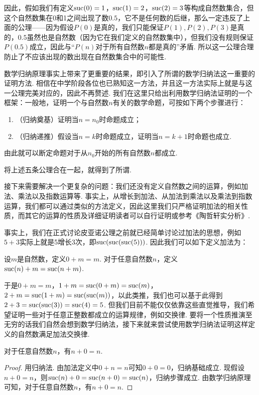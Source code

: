 因此，假如我们有定义$\operatorname{suc}(0)=1$，$\operatorname{suc}(1)=2$，$\operatorname{suc}(2)=3$等构成自然数集合，但这个自然数集在0和1之间出现了数$0.5$，它不是任何数的后继，那么一定违反了上面的公理——因为假设$P(0)$是真的，我们只能保证$P(1),P(2),P(3)$是真的，$0.5$虽然也是自然数（因为它在我们定义的自然数集中），但我们没有规则保证$P(0.5)$成立，因此与``$P(n)$对于所有自然数$n$都是真的''矛盾. 所以这一公理合理防止了不应该出现的数出现在自然数集合中的可能性.

数学归纳原理事实上带来了更重要的结果，即引入了所谓的数学归纳法这一重要的证明方法. 相信在中学阶段各位也已熟知这一方法，并且这一方法实际上就是与这一公理完美对应的，因此不再赘述. 我们在这里只给出利用数学归纳法证明的一个框架：一般地，证明一个与自然数$n$有关的数学命题，可按如下两个步骤进行：
\begin{enumerate}
    \item（归纳奠基）证明当$n=n_0$时命题成立；

    \item（归纳递推）假设当$n=k$时命题成立，证明当$n=k+1$时命题也成立.
\end{enumerate}
由此就可以断定命题对于从$n_0$开始的所有自然数$n$都成立.

将上述五条公理合在一起，就得到了所谓.

接下来需要解决一个更复杂的问题：我们还没有定义自然数之间的运算，例如加法、乘法以及指数运算等. 事实上，从增长到加法、从加法到乘法以及乘法到指数运算，我们都可以通过类似的方法定义，因此这里我们只严格证明加法的相关性质，而其它的运算的性质及详细证明读者可以自行证明或参考《陶哲轩实分析》.

事实上，我们在正式讨论皮亚诺公理之前就已经简单讨论过加法的思想，例如$5+3$实际上就是5增长3次，即$\operatorname{suc}(\operatorname{suc}(\operatorname{suc}(5)))$. 因此我们可以如下定义加法为：

\begin{definition}{}{}
    设$m$是自然数，定义$0+m=m$. 对于任意自然数$n$，定义$\operatorname{suc}(n)+m=\operatorname{suc}(n+m)$.
\end{definition}

于是$0+m=m$，$1+m=\operatorname{suc}(0+m)=\operatorname{suc}(m)$，$2+m=\operatorname{suc}(1+m)=\operatorname{suc}(\operatorname{suc}(m))$，以此类推，我们也可以基于此得到$2+3=\operatorname{suc}(\operatorname{suc}(3))=\operatorname{suc}(4)=5$. 但我们目前不能仅仅依靠这些直觉推导，我们希望证明一些对于任意正整数都成立的运算规律，例如交换律. 要将一个性质推演至无穷的话我们自然会想到数学归纳法，接下来就来尝试使用数学归纳法证明这样定义的自然数满足加法交换律.

\begin{lemma}{}{}
    对于任意自然数$n$，有$n+0=n$.
\end{lemma}
\begin{proof}
    用归纳法. 由加法定义中$0+n=n$可知$0+0=0$，归纳基础成立. 现假设$n+0=n$，则$\operatorname{suc}(n)+0=\operatorname{suc}(n+0)=\operatorname{suc}(n)$，归纳步骤成立. 由数学归纳原理可知，对于任意自然数$n$，有$n+0=n$.
\end{proof}

